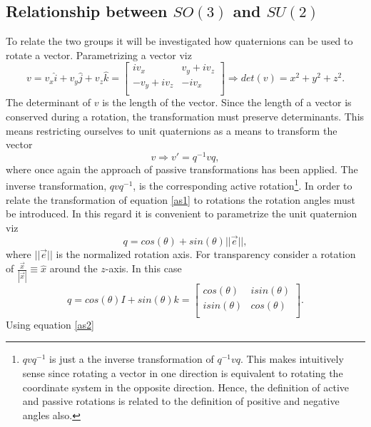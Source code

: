 \subsection{Relationship between $SO(3)$ and $SU(2)$}
To relate the two groups it will be investigated how quaternions can be used to rotate a vector. Parametrizing a vector viz
\begin{equation}
	v=v_x\hat{i}+v_y\hat{j}+v_z\hat{k}=\begin{bmatrix}
		iv_x & v_y+iv_z\\
		-v_y+iv_z & -iv_x\\
	\end{bmatrix}\Rightarrow det(v)=x^2+y^2+z^2.
	\label{as4}
\end{equation} 
The determinant of $v$ is the length of the vector. Since the length of a vector is conserved during a rotation, the transformation must preserve determinants. This means restricting ourselves to unit quaternions as a means to transform the vector
\begin{equation}
	v\Rightarrow v'=q^{-1}vq,
	\label{as1}
\end{equation} 
where once again the approach of passive transformations has been applied. The inverse transformation, $qvq^{-1}$, is the corresponding active rotation\footnote{$qvq^{-1}$ is just a the inverse transformation of $q^{-1}vq$. This makes intuitively sense since rotating a vector in one direction is equivalent to rotating the coordinate system in the opposite direction. Hence, the definition of active and passive rotations is related to the definition of positive and negative angles also.}. In order to relate the transformation of equation \eqref{as1} to rotations the rotation angles must be introduced. In this regard it is convenient to parametrize the unit quaternion viz
\begin{equation}
	q=cos(\theta)+sin(\theta)||\vec{e}||,
\end{equation} 
where $||\vec{e}||$ is the normalized rotation axis. For transparency consider a rotation of $\frac{\vec{x}}{|\vec{x}|}\equiv \hat{x}$ around the $z$-axis. In this case
\begin{equation}
	q=cos(\theta)I+sin(\theta)k=\begin{bmatrix}
		cos(\theta) & isin(\theta)\\
		isin(\theta) & cos(\theta)\\
	\end{bmatrix}.
	\label{as2}
\end{equation} 
Using equation \eqref{as2}
